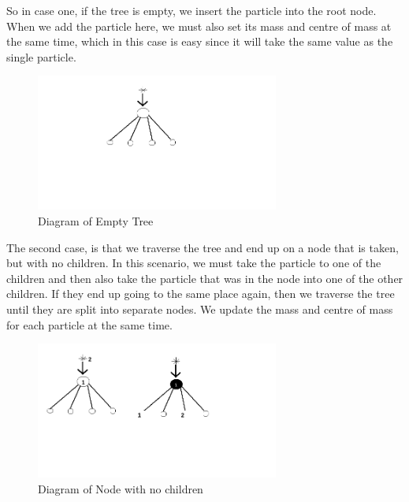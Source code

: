 So in case one, if the tree is empty, we insert the particle into the root node. When we add the particle here, we must also set its mass and centre of mass at the same time, which in this case is easy since it will take the same value as the single particle.
\begin{figure}[htb]
  \begin{center}
    \includegraphics[width=8cm]{../images/empty_tree.png}
    \caption{Diagram of Empty Tree}
  \end{center}
\end{figure}

The second case, is that we traverse the tree and end up on a node that is taken, but with no children. In this scenario, we must take the particle to one of the children and then also take the particle that was in the node into one of the other children. If they end up going to the same place again, then we traverse the tree until they are split into separate nodes. We update the mass and centre of mass for each particle at the same time.
\begin{figure}[htb]
  \begin{center}
    \includegraphics[width=8cm]{../images/node_no_children.png}
    \caption{Diagram of Node with no children}
  \end{center}
\end{figure}

